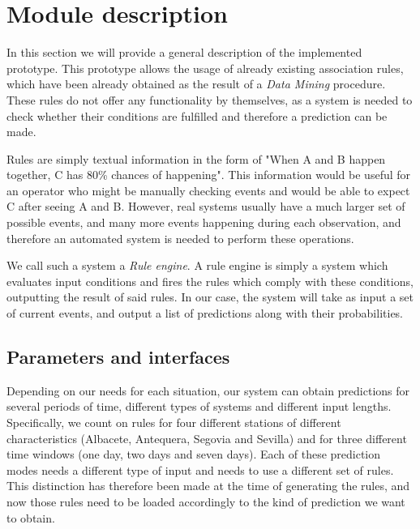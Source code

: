 \documentclass[a4paper,12pt]{article}
\begin{document}
\cleardoublepage
{} %
\listoftables %
\cleardoublepage

\setcounter{page}{1}

\section{Module description}

In this section we will provide a general description of the implemented prototype. This prototype allows the usage of already existing association rules, which have been already obtained as the result of a \emph{Data Mining} procedure. These rules do not offer any functionality by themselves, as a system is needed to check whether their conditions are fulfilled and therefore a prediction can be made.

Rules are simply textual information in the form of "When A and B happen together, C has 80\% chances of happening". This information would be useful for an operator who might be manually checking events and would be able to expect C after seeing A and B. However, real systems usually have a much larger set of possible events, and many more events happening during each observation, and therefore an automated system is needed to perform these operations.

We call such a system a \emph{Rule engine}\cite{liang2009openrulebench}. A rule engine is simply a system which evaluates input conditions and fires the rules which comply with these conditions, outputting the result of said rules. In our case, the system will take as input a set of current events, and output a list of predictions along with their probabilities.

\subsection{Parameters and interfaces}
Depending on our needs for each situation, our system can obtain predictions for several periods of time, different types of systems and different input lengths. Specifically, we count on rules for four different stations of different characteristics (Albacete, Antequera, Segovia and Sevilla) and for three different time windows (one day, two days and seven days). Each of these prediction modes needs a different type of input and needs to use a different set of rules. This distinction has therefore been made at the time of generating the rules, and now those rules need to be loaded accordingly to the kind of prediction we want to obtain.
\end{document}
